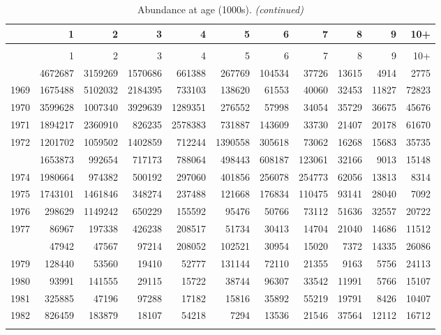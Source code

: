 \documentclass[
]{article}
\begin{document}
\begin{longtable}[t]{lrrrrrrrrrr}
\caption{\label{tab:NAA-table}Abundance at age (1000s).}\\
\toprule
  & 1 & 2 & 3 & 4 & 5 & 6 & 7 & 8 & 9 & 10+\\
\midrule
\endfirsthead
\caption[]{Abundance at age (1000s). \textit{(continued)}}\\
\toprule
  & 1 & 2 & 3 & 4 & 5 & 6 & 7 & 8 & 9 & 10+\\
\midrule
\endhead

\endfoot
\bottomrule
\endlastfoot
1968 & 4672687 & 3159269 & 1570686 & 661388 & 267769 & 104534 & 37726 & 13615 & 4914 & 2775\\
1969 & 1675488 & 5102032 & 2184395 & 733103 & 138620 & 61553 & 40060 & 32453 & 11827 & 72823\\
1970 & 3599628 & 1007340 & 3929639 & 1289351 & 276552 & 57998 & 34054 & 35729 & 36675 & 45676\\
1971 & 1894217 & 2360910 & 826235 & 2578383 & 731887 & 143609 & 33730 & 21407 & 20178 & 61670\\
1972 & 1201702 & 1059502 & 1402859 & 712244 & 1390558 & 305618 & 73062 & 16268 & 15683 & 35735\\
\addlinespace
1973 & 1653873 & 992654 & 717173 & 788064 & 498443 & 608187 & 123061 & 32166 & 9013 & 15148\\
1974 & 1980664 & 974382 & 500192 & 297060 & 401856 & 256078 & 254773 & 62056 & 13813 & 8314\\
1975 & 1743101 & 1461846 & 348274 & 237488 & 121668 & 176834 & 110475 & 93141 & 28040 & 7092\\
1976 & 298629 & 1149242 & 650229 & 155592 & 95476 & 50766 & 73112 & 51636 & 32557 & 20722\\
1977 & 86967 & 197338 & 426238 & 208517 & 51734 & 30413 & 14704 & 21040 & 14686 & 11512\\
\addlinespace
1978 & 47942 & 47567 & 97214 & 208052 & 102521 & 30954 & 15020 & 7372 & 14335 & 26086\\
1979 & 128440 & 53560 & 19410 & 52777 & 131144 & 72110 & 21355 & 9163 & 5756 & 24113\\
1980 & 93991 & 141555 & 29115 & 15722 & 38744 & 96307 & 33542 & 11991 & 5766 & 15107\\
1981 & 325885 & 47196 & 97288 & 17182 & 15816 & 35892 & 55219 & 19791 & 8426 & 10407\\
1982 & 826459 & 183879 & 18107 & 54218 & 7294 & 13536 & 21546 & 37564 & 12112 & 16712\\
\addlinespace

\end{longtable}
\end{document}
